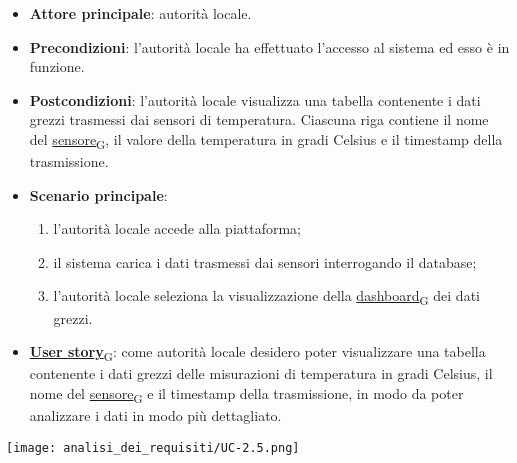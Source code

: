 \begin{itemize}
	\item \textbf{Attore principale}: autorità locale.
	\item \textbf{Precondizioni}: l'autorità locale ha effettuato l'accesso al sistema ed esso è in funzione.
	\item \textbf{Postcondizioni}: l'autorità locale visualizza una tabella contenente i dati grezzi trasmessi dai sensori di temperatura.
	      Ciascuna riga contiene il nome del \href{https://7last.github.io/docs/pb/documentazione-interna/glossario\#sensore}{sensore\textsubscript{G}}, il valore della temperatura in gradi Celsius e il timestamp della trasmissione.
	\item \textbf{Scenario principale}:
	      \begin{enumerate}
		      \item l'autorità locale accede alla piattaforma;
		      \item il sistema carica i dati trasmessi dai sensori interrogando il database;
		      \item l'autorità locale seleziona la visualizzazione della \href{https://7last.github.io/docs/pb/documentazione-interna/glossario\#dashboard}{dashboard\textsubscript{G}} dei dati grezzi.
	      \end{enumerate}
	\item \href{https://7last.github.io/docs/pb/documentazione-interna/glossario\#user-story}{\textbf{User story}\textsubscript{G}}:
	      come autorità locale desidero poter visualizzare una tabella contenente i dati grezzi delle misurazioni di temperatura
	      in gradi Celsius, il nome del \href{https://7last.github.io/docs/pb/documentazione-interna/glossario\#sensore}{sensore\textsubscript{G}} e il timestamp della trasmissione, in modo da poter analizzare i dati in modo più dettagliato.
\end{itemize}
\begin{center}
	\texttt{[image: analisi\_dei\_requisiti/UC-2.5.png]}
\end{center}

